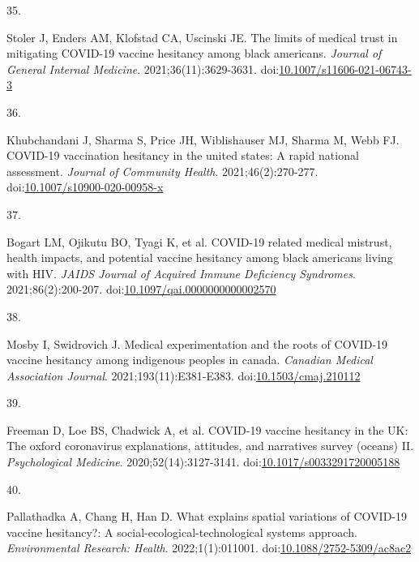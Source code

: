 \documentclass[
  letterpaper,
  DIV=11,
  numbers=noendperiod]{scrartcl}
\newlength{\cslhangindent}
\newlength{\csllabelwidth}
\newlength{\cslentryspacingunit} %
\newenvironment{CSLReferences}[2] %
 {%
  \setlength{\parindent}{0pt}
  \ifodd #1
  \let\oldpar\par
  \def\par{\hangindent=\cslhangindent\oldpar}
  \fi
  \setlength{\parskip}{#2\cslentryspacingunit}
 }%
 {}
\newcommand{\CSLLeftMargin}[1]{\parbox[t]{\csllabelwidth}{#1}}
\newcommand{\CSLRightInline}[1]{\parbox[t]{\linewidth - \csllabelwidth}{#1}\break}
\begin{document}
\begin{CSLReferences}{0}{0}
\leavevmode{}%
\CSLLeftMargin{35. }%
\CSLRightInline{Stoler J, Enders AM, Klofstad CA, Uscinski JE. The
limits of medical trust in mitigating {COVID}-19 vaccine hesitancy among
black americans. \emph{Journal of General Internal Medicine}.
2021;36(11):3629-3631.
doi:\href{https://doi.org/10.1007/s11606-021-06743-3}{10.1007/s11606-021-06743-3}}

\leavevmode{}%
\CSLLeftMargin{36. }%
\CSLRightInline{Khubchandani J, Sharma S, Price JH, Wiblishauser MJ,
Sharma M, Webb FJ. {COVID}-19 vaccination hesitancy in the united
states: A rapid national assessment. \emph{Journal of Community Health}.
2021;46(2):270-277.
doi:\href{https://doi.org/10.1007/s10900-020-00958-x}{10.1007/s10900-020-00958-x}}

\leavevmode{}%
\CSLLeftMargin{37. }%
\CSLRightInline{Bogart LM, Ojikutu BO, Tyagi K, et al. {COVID}-19
related medical mistrust, health impacts, and potential vaccine
hesitancy among black americans living with {HIV}. \emph{{JAIDS} Journal
of Acquired Immune Deficiency Syndromes}. 2021;86(2):200-207.
doi:\href{https://doi.org/10.1097/qai.0000000000002570}{10.1097/qai.0000000000002570}}

\leavevmode{}%
\CSLLeftMargin{38. }%
\CSLRightInline{Mosby I, Swidrovich J. Medical experimentation and the
roots of {COVID}-19 vaccine hesitancy among indigenous peoples in
canada. \emph{Canadian Medical Association Journal}.
2021;193(11):E381-E383.
doi:\href{https://doi.org/10.1503/cmaj.210112}{10.1503/cmaj.210112}}

\leavevmode{}%
\CSLLeftMargin{39. }%
\CSLRightInline{Freeman D, Loe BS, Chadwick A, et al. {COVID}-19 vaccine
hesitancy in the {UK}: The oxford coronavirus explanations, attitudes,
and narratives survey (oceans) {II}. \emph{Psychological Medicine}.
2020;52(14):3127-3141.
doi:\href{https://doi.org/10.1017/s0033291720005188}{10.1017/s0033291720005188}}

\leavevmode{}%
\CSLLeftMargin{40. }%
\CSLRightInline{Pallathadka A, Chang H, Han D. What explains spatial
variations of {COVID}-19 vaccine hesitancy?: A
social-ecological-technological systems approach. \emph{Environmental
Research: Health}. 2022;1(1):011001.
doi:\href{https://doi.org/10.1088/2752-5309/ac8ac2}{10.1088/2752-5309/ac8ac2}}


\end{CSLReferences}
\end{document}
